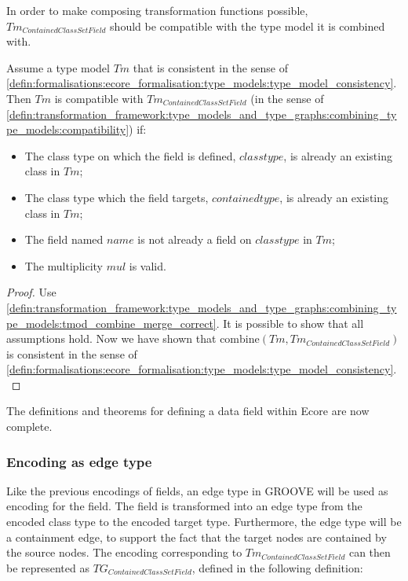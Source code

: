 In order to make composing transformation functions possible, $Tm_{ContainedClassSetField}$ should be compatible with the type model it is combined with.

\begin{thm}
\label{defin:library_of_transformations:type_level_transformations:contained_class_set_fields:tmod_contained_class_set_field_combine_correct}
Assume a type model $Tm$ that is consistent in the sense of \cref{defin:formalisations:ecore_formalisation:type_models:type_model_consistency}. Then $Tm$ is compatible with $Tm_{ContainedClassSetField}$ (in the sense of \cref{defin:transformation_framework:type_models_and_type_graphs:combining_type_models:compatibility}) if:
\begin{itemize}
    \item The class type on which the field is defined, $classtype$, is already an existing class in $Tm$;
    \item The class type which the field targets, $containedtype$, is already an existing class in $Tm$;
    \item The field named $name$ is not already a field on $classtype$ in $Tm$;
    \item The multiplicity $mul$ is valid.
\end{itemize}
\end{thm}

\begin{proof}
Use \cref{defin:transformation_framework:type_models_and_type_graphs:combining_type_models:tmod_combine_merge_correct}. It is possible to show that all assumptions hold. Now we have shown that $\mathrm{combine}(Tm, Tm_{ContainedClassSetField})$ is consistent in the sense of \cref{defin:formalisations:ecore_formalisation:type_models:type_model_consistency}.
\end{proof}

The definitions and theorems for defining a data field within Ecore are now complete. 

\subsubsection{Encoding as edge type}

Like the previous encodings of fields, an edge type in GROOVE will be used as encoding for the field. The field is transformed into an edge type from the encoded class type to the encoded target type. Furthermore, the edge type will be a containment edge, to support the fact that the target nodes are contained by the source nodes. The encoding corresponding to $Tm_{ContainedClassSetField}$ can then be represented as $TG_{ContainedClassSetField}$, defined in the following definition:

